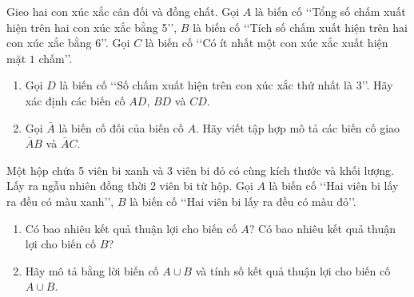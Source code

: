 \begin{bt}
	Gieo hai con xúc xắc cân đối và đồng chất. Gọi $A$ là biến cố \lq\lq  Tổng số chấm xuất hiện trên hai con xúc xắc bằng 5\rq\rq, $B$ là biến cố \lq\lq  Tích số chấm xuất hiện trên hai con xúc xắc bằng 6\rq\rq. Gọi $C$ là biến cố \lq\lq  Có ít nhất một con xúc xắc xuất hiện mặt $1$ chấm\rq\rq.
	\begin{enumerate}
	\item Gọi $D$ là biến cố \lq\lq  Số chấm xuất hiện trên con xúc xắc thứ nhất là 3\rq\rq. Hãy xác định các biến cố $AD$, $BD$ và $CD$.
	\item Gọi $\bar{A}$ là biến cố đối của biến cố $A$. Hãy viết tập hợp mô tả các biến cố giao $\bar{A}B$ và $\bar{A}C$.
	\end{enumerate}
\end{bt}
\begin{bt}%
	Một hộp chứa 5 viên bi xanh và 3 viên bi đỏ có cùng kích thước và khối lượng. Lấy ra ngẫu nhiên đồng thời 2 viên bi từ hộp. Gọi $A$ là biến cố \lq\lq  Hai viên bi lấy ra đều có màu xanh\rq\rq, $B$ là biến cố \lq\lq  Hai viên bi lấy ra đều có màu đỏ\rq\rq.
	\begin{enumerate}
	\item Có bao nhiêu kết quả thuận lợi cho biến cố $A$? Có bao nhiêu kết quả thuận lợi cho biến cố $B$?
	\item Hãy mô tả bằng lời biến cố $A \cup B$ và tính số kết quả thuận lợi cho biến cố $A \cup B$.
	\end{enumerate}
\end{bt}
